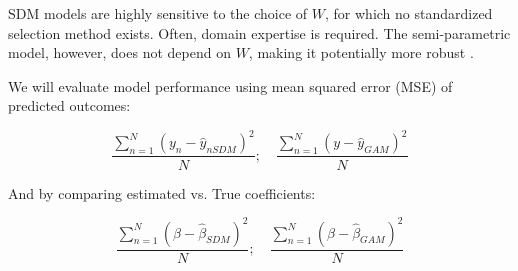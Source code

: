 
SDM models are highly sensitive to the choice of $W$, for which no standardized selection method exists. Often,
domain expertise is required. The semi-parametric model, however, does not depend on $W$, making it potentially more robust \cite{hora2015review}.

We will evaluate model performance using mean squared error (MSE) of predicted outcomes:

\begin{equation}
	\frac{\sum_{n=1}^N(y_n-\hat{y}_{nSDM})^2}{N}; \quad \frac{\sum_{n=1}^N(y-\hat{y}_{GAM})^2}{N}
	\label{eq:pref}
\end{equation}

And by comparing estimated vs. True coefficients:

\begin{equation}
	\frac{\sum_{n=1}^N(\beta-\hat{\beta}_{SDM})^2}{N}; \quad \frac{\sum_{n=1}^N(\beta-\hat{\beta}_{GAM})^2}{N}
	\label{eq:pref2}
\end{equation}

